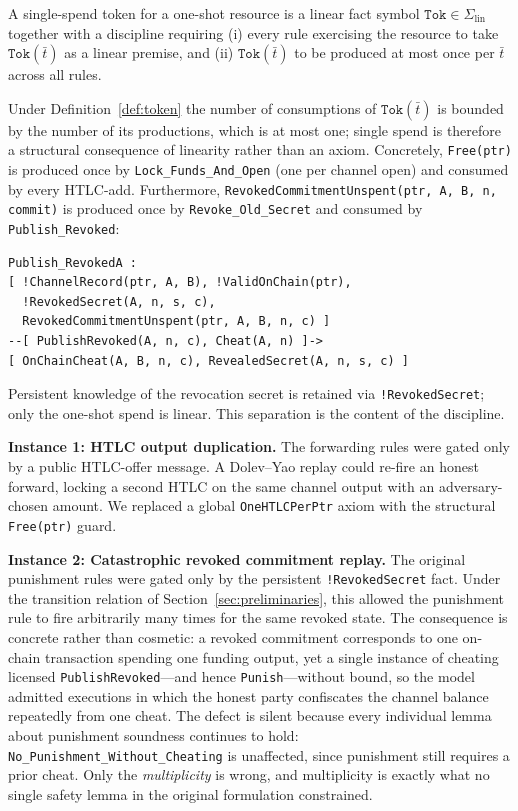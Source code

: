\documentclass[sigconf,review]{acmart}
\theoremstyle{acmdefinition}
\begin{document}
\begin{definition}
\label{def:token}
A single-spend token for a one-shot resource is a linear fact symbol $\texttt{Tok} \in \Sigma_{\text{lin}}$ together with a discipline requiring (i) every rule exercising the resource to take $\texttt{Tok}(\bar t)$ as a linear premise, and (ii) $\texttt{Tok}(\bar t)$ to be produced at most once per $\bar t$ across all rules.
\end{definition}

Under Definition~\ref{def:token} the number of consumptions of $\texttt{Tok}(\bar t)$ is bounded by the number of its productions, which is at most one; single spend is therefore a structural consequence of linearity rather than an axiom. Concretely, \texttt{Free(ptr)} is produced once by \texttt{Lock\_Funds\_And\_Open} (one per channel open) and consumed by every HTLC-add. Furthermore, \texttt{RevokedCommitmentUnspent(ptr, A, B, n, commit)} is produced once by \texttt{Revoke\_Old\_Secret} and consumed by \texttt{Publish\_Revoked}:
\begin{verbatim}
Publish_RevokedA :
[ !ChannelRecord(ptr, A, B), !ValidOnChain(ptr),
  !RevokedSecret(A, n, s, c),
  RevokedCommitmentUnspent(ptr, A, B, n, c) ]
--[ PublishRevoked(A, n, c), Cheat(A, n) ]->
[ OnChainCheat(A, B, n, c), RevealedSecret(A, n, s, c) ]
\end{verbatim}
Persistent knowledge of the revocation secret is retained via \texttt{!RevokedSecret}; only the one-shot spend is linear. This separation is the content of the discipline.

\textbf{Instance 1: HTLC output duplication.} The forwarding rules were gated only by a public HTLC-offer message. A Dolev--Yao replay could re-fire an honest forward, locking a second HTLC on the same channel output with an adversary-chosen amount. We replaced a global \texttt{OneHTLCPerPtr} axiom with the structural \texttt{Free(ptr)} guard.

\textbf{Instance 2: Catastrophic revoked commitment replay.} The original punishment rules were gated only by the persistent \texttt{!RevokedSecret} fact. Under the transition relation of Section~\ref{sec:preliminaries}, this allowed the punishment rule to fire arbitrarily many times for the same revoked state. The consequence is concrete rather than cosmetic: a revoked commitment corresponds to one on-chain transaction spending one funding output, yet a single instance of cheating licensed \texttt{PublishRevoked}---and hence \texttt{Punish}---without bound, so the model admitted executions in which the honest party confiscates the channel balance repeatedly from one cheat. The defect is silent because every individual lemma about punishment soundness continues to hold: \texttt{No\_Punishment\_Without\_Cheating} is unaffected, since punishment still requires a prior cheat. Only the \emph{multiplicity} is wrong, and multiplicity is exactly what no single safety lemma in the original formulation constrained.
\end{document}
